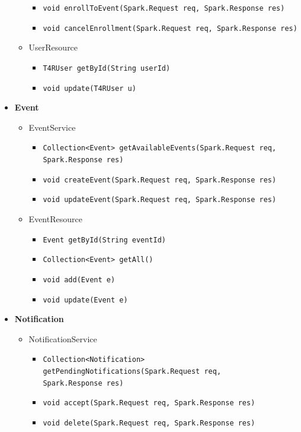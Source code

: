 \documentclass[a4paper, hidelinks, 12pt]{report}
\begin{document}
\begin{itemize}
\begin{itemize}
\begin{itemize}
						\item{\verb|void enrollToEvent(Spark.Request req, Spark.Response res)|}
						\item{\verb|void cancelEnrollment(Spark.Request req, Spark.Response res)|}
					\end{itemize}
				\item{UserResource}
					\begin{itemize}
						\item{\verb|T4RUser getById(String userId)|}
						\item{\verb|void update(T4RUser u)|}
					\end{itemize}
			\end{itemize}
		\item{\textbf{Event}}
			\begin{itemize}
				\item{EventService}
					\begin{itemize}
						\item{\verb|Collection<Event> getAvailableEvents(Spark.Request req,|\\ \verb|Spark.Response res)|}
						\item{\verb|void createEvent(Spark.Request req, Spark.Response res)|}
						\item{\verb|void updateEvent(Spark.Request req, Spark.Response res)|}
					\end{itemize}
				\item{EventResource}
					\begin{itemize}
						\item{\verb|Event getById(String eventId)|}
						\item{\verb|Collection<Event> getAll()|}
						\item{\verb|void add(Event e)|}
						\item{\verb|void update(Event e)|}
					\end{itemize}
			\end{itemize}
		\item{\textbf{Notification}}
			\begin{itemize}
				\item{NotificationService}
					\begin{itemize}
						\item{\verb|Collection<Notification> getPendingNotifications(Spark.Request req,|\\ \verb|Spark.Response res)|}
						\item{\verb|void accept(Spark.Request req, Spark.Response res)|}
						\item{\verb|void delete(Spark.Request req, Spark.Response res)|}

\end{itemize}
\end{itemize}
\end{itemize}
\end{document}
